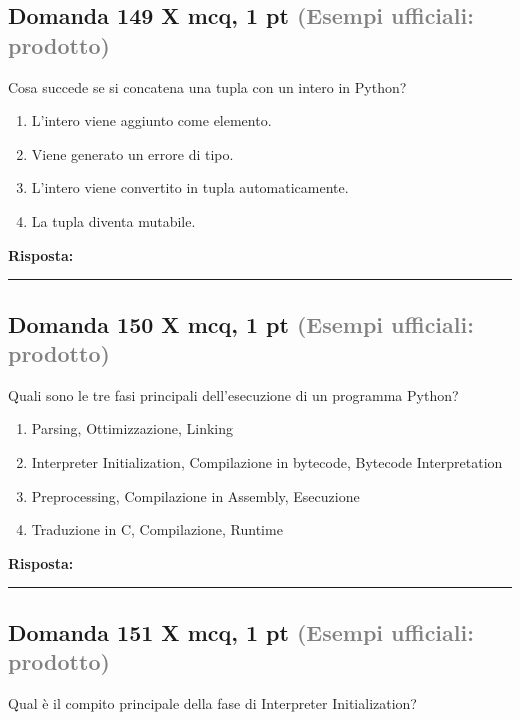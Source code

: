 \documentclass[a4paper,11pt]{article}
\begin{document}
\subsection*{Domanda 149 X \hfill {\small mcq, 1 pt \textcolor{gray}{(Esempi ufficiali: prodotto)}}}
Cosa succede se si concatena una tupla con un intero in Python?

\begin{enumerate}[label=\alph*)]
\item L'intero viene aggiunto come elemento.
\item Viene generato un errore di tipo.
\item L'intero viene convertito in tupla automaticamente.
\item La tupla diventa mutabile.
\end{enumerate}
\vspace{0.2cm}
\noindent\textbf{Risposta:}\par
\vspace{1.5cm}\hrule


\subsection*{Domanda 150 X \hfill {\small mcq, 1 pt \textcolor{gray}{(Esempi ufficiali: prodotto)}}}
Quali sono le tre fasi principali dell'esecuzione di un programma Python?

\begin{enumerate}[label=\alph*)]
\item Parsing, Ottimizzazione, Linking
\item Interpreter Initialization, Compilazione in bytecode, Bytecode Interpretation
\item Preprocessing, Compilazione in Assembly, Esecuzione
\item Traduzione in C, Compilazione, Runtime
\end{enumerate}
\vspace{0.2cm}
\noindent\textbf{Risposta:}\par
\vspace{1.5cm}\hrule


\subsection*{Domanda 151 X \hfill {\small mcq, 1 pt \textcolor{gray}{(Esempi ufficiali: prodotto)}}}
Qual è il compito principale della fase di Interpreter Initialization?
\end{document}
